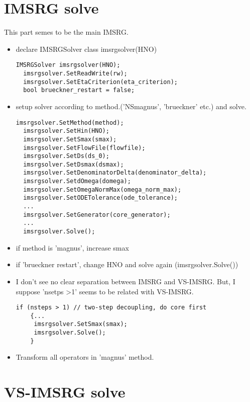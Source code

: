 \section{IMSRG solve}
 This part semes to be the main IMSRG. 
\begin{itemize}
  \item declare IMSRGSolver class imsrgsolver(HNO) 
   \begin{lstlisting}[frame=single]
  IMSRGSolver imsrgsolver(HNO);
  imsrgsolver.SetReadWrite(rw);
  imsrgsolver.SetEtaCriterion(eta_criterion);
  bool brueckner_restart = false;
   \end{lstlisting}
 \item setup solver according to method.('NSmagnus', 'brueckner' etc.) 
      and solve.
  \begin{lstlisting}[frame=single]
  imsrgsolver.SetMethod(method);
  imsrgsolver.SetHin(HNO);
  imsrgsolver.SetSmax(smax);
  imsrgsolver.SetFlowFile(flowfile);
  imsrgsolver.SetDs(ds_0);
  imsrgsolver.SetDsmax(dsmax);
  imsrgsolver.SetDenominatorDelta(denominator_delta);
  imsrgsolver.SetdOmega(domega);
  imsrgsolver.SetOmegaNormMax(omega_norm_max);
  imsrgsolver.SetODETolerance(ode_tolerance);
  ...
  imsrgsolver.SetGenerator(core_generator);
  ... 
  imsrgsolver.Solve();
   \end{lstlisting}
 \item if method is 'magnus', increase smax 
 \item if 'brueckner restart',
       change HNO and  solve again (imsrgsolver.Solve())     
 \item I don't see no clear separation between IMSRG and VS-IMSRG.
 But, I suppose 'nsetps >1' seems to be related with VS-IMSRG. 
    
  \begin{lstlisting}[frame=single]
    if (nsteps > 1) // two-step decoupling, do core first
    {...
     imsrgsolver.SetSmax(smax);
     imsrgsolver.Solve();
    } 
  \end{lstlisting} 

 \item Transform all operators in 'magnus' method. 
\end{itemize} 
\section{VS-IMSRG solve}

